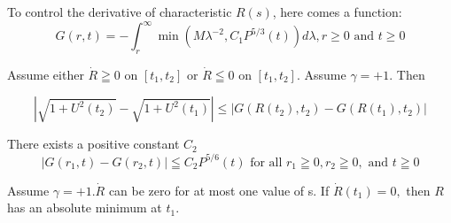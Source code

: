 \begin{definition}
    To control the derivative of characteristic $R(s)$, here comes a function: 
\begin{equation}
    G(r, t)=-\int_{r}^{\infty} \min \left(M \lambda^{-2}, C_{1} P^{5 / 3}(t)\right) d \lambda, r\geq 0 \text{ and } t \geq 0
\end{equation}

\end{definition}
\begin{lemma}
    \label{sqrt(1plusU)diff_leq_Gdiff}
    Assume either $\dot{R} \geqq 0$ on $\left[t_{1}, t_{2}\right]$ or $\dot{R} \leqq 0$ on $\left[t_{1}, t_{2}\right] .$ Assume  $ \gamma=+1$. Then

    \begin{equation}
|\sqrt{1+U^{2}\left(t_{2}\right)}-\sqrt{1+U^{2}\left(t_{1}\right)}| \leq\left|G\left(R\left(t_{2}\right), t_{2}\right)-G\left(R\left(t_{1}\right), t_{2}\right)\right|
    \end{equation}

\end{lemma}
\begin{remark}
    There exists a positive constant $C_2$
    \begin{equation}
        \label{Gdiff_leq_P0833}
        \left|G\left(r_{1}, t\right)-G\left(r_{2}, t\right)\right| \leqq C_{2} P^{5 / 6}(t) \text { for all } r_{1} \geqq 0, r_{2} \geqq 0, \text { and } t \geqq 0
        \end{equation}
\end{remark}


\begin{lemma}
Assume $\gamma=+1 . \dot{R}$ can be zero for at most one value of s. If $\dot{R}\left(t_{1}\right)=0,$ then
$R$ has an absolute minimum at $t_{1}$.
\end{lemma}


